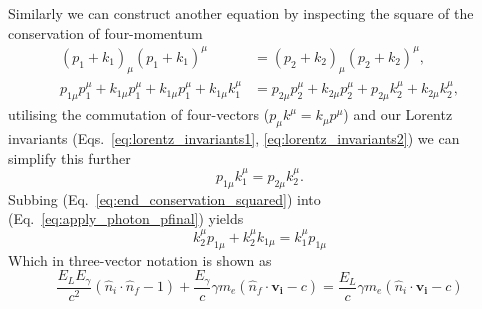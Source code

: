 \documentclass[../main.tex]{subfiles}
\begin{document}
Similarly we can construct another equation by inspecting the square of the conservation of four-momentum
\begin{align}
\left(p_{1}+k_{1}\right)_{\mu}\left(p_{1}+k_{1}\right)^{\mu} &= \left(p_{2}+k_{2}\right)_{\mu}\left(p_{2}+k_{2}\right)^{\mu}, \nonumber \\
p_{1\mu}p_{1}^{\mu}+k_{1\mu}p_{1}^{\mu}+k_{1\mu}p_{1}^{\mu}+k_{1\mu}k_{1}^{\mu} &= p_{2\mu}p_{2}^{\mu}+k_{2\mu}p_{2}^{\mu}+p_{2\mu}k_{2}^{\mu}+k_{2\mu}k_{2}^{\mu},
\label{eq:apply_conservation_squared}
\end{align}
utilising the commutation of four-vectors ($p_{\mu}k^{\mu} = k_{\mu}p^{\mu}$) and our Lorentz invariants (Eqs.~\ref{eq:lorentz_invariants1}, \ref{eq:lorentz_invariants2}) we can simplify this further 
\begin{equation}
p_{1\mu}k_{1}^{\mu} = p_{2\mu}k_{2}^{\mu}.
\label{eq:end_conservation_squared}
\end{equation}
Subbing (Eq.~\ref{eq:end_conservation_squared}) into (Eq.~\ref{eq:apply_photon_pfinal}) yields
\begin{equation}
k_{2}^{\mu}p_{1\mu}+k_{2}^{\mu}k_{1\mu} = k_{1}^{\mu}p_{1\mu}
\label{eq:substitution_four_vector}
\end{equation}
Which in three-vector notation is shown as
\begin{equation}
\frac{E_{L}E_{\gamma}}{c^{2}}\left(\hat{n}_{i}\cdot\hat{n}_{f}-1\right)+\frac{E_{\gamma}}{c}\gamma m_{e}\left(\hat{n}_{f}\cdot \boldsymbol{v_{i}}-c\right) = \frac{E_{L}}{c}\gamma m_{e}\left(\hat{n}_{i}\cdot \boldsymbol{v_{i}} -c\right)
\label{eq:three_vector_solution}
\end{equation}
\end{document}
